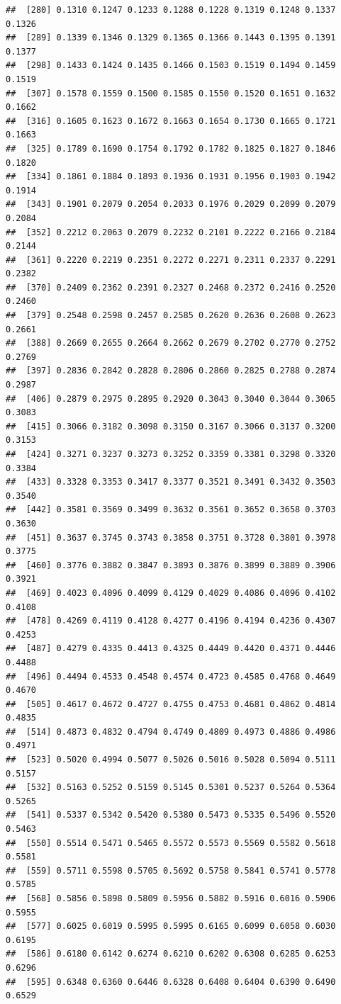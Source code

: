 \documentclass[]{article}
\begin{document}
\begin{verbatim}
##  [280] 0.1310 0.1247 0.1233 0.1288 0.1228 0.1319 0.1248 0.1337 0.1326
##  [289] 0.1339 0.1346 0.1329 0.1365 0.1366 0.1443 0.1395 0.1391 0.1377
##  [298] 0.1433 0.1424 0.1435 0.1466 0.1503 0.1519 0.1494 0.1459 0.1519
##  [307] 0.1578 0.1559 0.1500 0.1585 0.1550 0.1520 0.1651 0.1632 0.1662
##  [316] 0.1605 0.1623 0.1672 0.1663 0.1654 0.1730 0.1665 0.1721 0.1663
##  [325] 0.1789 0.1690 0.1754 0.1792 0.1782 0.1825 0.1827 0.1846 0.1820
##  [334] 0.1861 0.1884 0.1893 0.1936 0.1931 0.1956 0.1903 0.1942 0.1914
##  [343] 0.1901 0.2079 0.2054 0.2033 0.1976 0.2029 0.2099 0.2079 0.2084
##  [352] 0.2212 0.2063 0.2079 0.2232 0.2101 0.2222 0.2166 0.2184 0.2144
##  [361] 0.2220 0.2219 0.2351 0.2272 0.2271 0.2311 0.2337 0.2291 0.2382
##  [370] 0.2409 0.2362 0.2391 0.2327 0.2468 0.2372 0.2416 0.2520 0.2460
##  [379] 0.2548 0.2598 0.2457 0.2585 0.2620 0.2636 0.2608 0.2623 0.2661
##  [388] 0.2669 0.2655 0.2664 0.2662 0.2679 0.2702 0.2770 0.2752 0.2769
##  [397] 0.2836 0.2842 0.2828 0.2806 0.2860 0.2825 0.2788 0.2874 0.2987
##  [406] 0.2879 0.2975 0.2895 0.2920 0.3043 0.3040 0.3044 0.3065 0.3083
##  [415] 0.3066 0.3182 0.3098 0.3150 0.3167 0.3066 0.3137 0.3200 0.3153
##  [424] 0.3271 0.3237 0.3273 0.3252 0.3359 0.3381 0.3298 0.3320 0.3384
##  [433] 0.3328 0.3353 0.3417 0.3377 0.3521 0.3491 0.3432 0.3503 0.3540
##  [442] 0.3581 0.3569 0.3499 0.3632 0.3561 0.3652 0.3658 0.3703 0.3630
##  [451] 0.3637 0.3745 0.3743 0.3858 0.3751 0.3728 0.3801 0.3978 0.3775
##  [460] 0.3776 0.3882 0.3847 0.3893 0.3876 0.3899 0.3889 0.3906 0.3921
##  [469] 0.4023 0.4096 0.4099 0.4129 0.4029 0.4086 0.4096 0.4102 0.4108
##  [478] 0.4269 0.4119 0.4128 0.4277 0.4196 0.4194 0.4236 0.4307 0.4253
##  [487] 0.4279 0.4335 0.4413 0.4325 0.4449 0.4420 0.4371 0.4446 0.4488
##  [496] 0.4494 0.4533 0.4548 0.4574 0.4723 0.4585 0.4768 0.4649 0.4670
##  [505] 0.4617 0.4672 0.4727 0.4755 0.4753 0.4681 0.4862 0.4814 0.4835
##  [514] 0.4873 0.4832 0.4794 0.4749 0.4809 0.4973 0.4886 0.4986 0.4971
##  [523] 0.5020 0.4994 0.5077 0.5026 0.5016 0.5028 0.5094 0.5111 0.5157
##  [532] 0.5163 0.5252 0.5159 0.5145 0.5301 0.5237 0.5264 0.5364 0.5265
##  [541] 0.5337 0.5342 0.5420 0.5380 0.5473 0.5335 0.5496 0.5520 0.5463
##  [550] 0.5514 0.5471 0.5465 0.5572 0.5573 0.5569 0.5582 0.5618 0.5581
##  [559] 0.5711 0.5598 0.5705 0.5692 0.5758 0.5841 0.5741 0.5778 0.5785
##  [568] 0.5856 0.5898 0.5809 0.5956 0.5882 0.5916 0.6016 0.5906 0.5955
##  [577] 0.6025 0.6019 0.5995 0.5995 0.6165 0.6099 0.6058 0.6030 0.6195
##  [586] 0.6180 0.6142 0.6274 0.6210 0.6202 0.6308 0.6285 0.6253 0.6296
##  [595] 0.6348 0.6360 0.6446 0.6328 0.6408 0.6404 0.6390 0.6490 0.6529

\end{verbatim}
\end{document}

